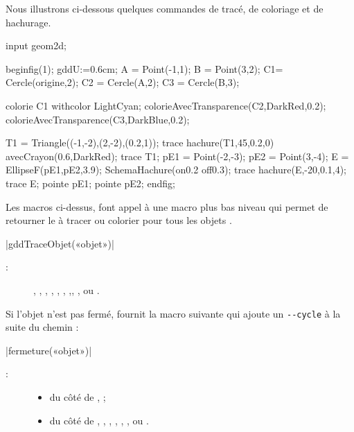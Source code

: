 \documentclass[a4paper,french]{article}
\begin{document}
Nous illustrons
ci-dessous quelques commandes de tracé, de coloriage et de hachurage. 

\begin{ExempleMP}
input geom2d;

beginfig(1);
gddU:=0.6cm;
A = Point(-1,1); B = Point(3,2);
C1= Cercle(origine,2);
C2 = Cercle(A,2); C3 = Cercle(B,3);

colorie C1 withcolor LightCyan;
colorieAvecTransparence(C2,DarkRed,0.2);
colorieAvecTransparence(C3,DarkBlue,0.2);

T1 = Triangle((-1,-2),(2,-2),(0.2,1));
trace hachure(T1,45,0.2,0) avecCrayon(0.6,DarkRed);
trace T1;
pE1 = Point(-2,-3); 
pE2 = Point(3,-4); 
E = EllipseF(pE1,pE2,3.9);
SchemaHachure(on0.2 off0.3);
trace hachure(E,-20,0.1,4);
trace E;
pointe pE1; pointe pE2;
endfig;
\end{ExempleMP}


Les macros ci-dessus, font appel à une macro plus bas niveau qui permet de
retourner le  à tracer ou colorier pour tous les objets \mpgeomdd.

\begin{colourband}
\macro|gddTraceObjet(«objet»)|
\begin{description}
  \item[:]
   , , ,
   , , , ,, , ou
  .
\end{description}
\end{colourband}

Si l'objet n'est pas fermé, \mpgeomdd fournit la macro suivante qui ajoute un
\lstinline+--cycle+ à la suite du chemin :
\begin{colourband}
\macro|fermeture(«objet»)|
\begin{description}
  \item[:]
  \begin{itemize}
    \item du côté de \MP,  ;
    \item du côté de \mpgeomdd, , , ,
   , , ou
  .
  \end{itemize}
\end{description}
\end{colourband}
\end{document}
